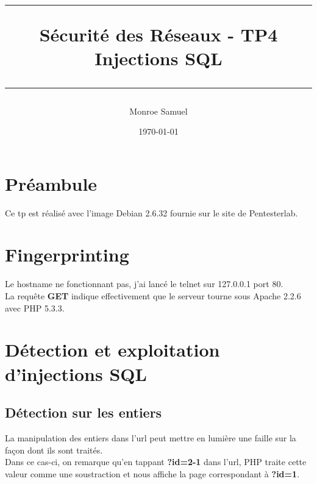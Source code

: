 \documentclass[a4paper,10pt,final,fleqn]{article}
\title{
\parbox{15cm}
{ %
  \vspace{3cm}
	\begin{center}\sf\bfseries\Huge
		\rule{15cm}{1pt}
		\medskip
		Sécurité des Réseaux - TP4 \\
		\huge Injections SQL
		\vspace{.5cm}
		\rule{15cm}{1pt}
	\end{center}
	\vspace{3cm}
 }}
\author{Monroe Samuel}
\date{\today}
\begin{document}
\maketitle
\newpage

	\section{Préambule}

		Ce tp est réalisé avec l'image Debian 2.6.32 fournie sur le site de Pentesterlab.

	\section{Fingerprinting}

		Le hostname ne fonctionnant pas, j'ai lancé le telnet sur 127.0.0.1 port 80.\\

		La requête \textbf{GET} indique effectivement que le serveur tourne sous Apache 2.2.6 avec PHP 5.3.3.\\

	\section{Détection et exploitation d'injections SQL}

		\subsection{Détection sur les entiers}

			La manipulation des entiers dans l'url peut mettre en lumière une faille sur la façon dont ils sont traités.\\
			Dans ce cas-ci, on remarque qu'en tappant \textbf{?id=2-1} dans l'url, PHP traite cette valeur comme une soustraction et nous affiche la page correspondant à \textbf{?id=1}.\\

			
		
		
\end{document}
